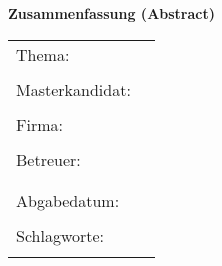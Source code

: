 
\begin{center}
{\Large \textbf{Zusammenfassung (Abstract)}}
\end{center}

\bigskip

\begin{center}
	\begin{tabular}{p{2.8cm}p{10cm}}
		Thema: & \thema \\
		 & \\
		Masterkandidat: & \autor \\
		 & \\
		Firma: & \firma \\
		 & \\
		Betreuer: & \prueferA  \\[.5ex]
		 &  \prueferB \\
		 & \\
		Abgabedatum: & \abgabedatum \\
		 & \\
		Schlagworte: & \schlagworte \\
		 & \\
	\end{tabular}
\end{center}

\bigskip

\noindent
\zusammenfassung
